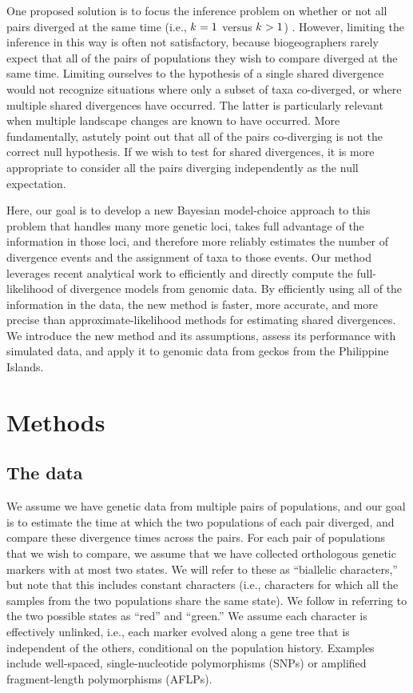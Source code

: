 One proposed solution is to focus the inference problem on whether or not all
pairs diverged at the same time (i.e., $k_{} = 1$ versus
$k_{} > 1$) \citep{Hickerson2013}.
However, limiting the inference in this way is often not satisfactory, because
biogeographers rarely expect that all of the pairs of populations they wish
to compare diverged at the same time.
Limiting ourselves to the hypothesis of a single shared divergence would not
recognize situations where only a subset of taxa co-diverged, or where multiple
shared divergences have occurred.
The latter is particularly relevant when multiple landscape changes are known
to have occurred.
More fundamentally,
\citet{Papadopoulou2016}
astutely point out that all of the pairs co-diverging is not the correct null
hypothesis.
If we wish to test for shared divergences, it is more appropriate to consider
all the pairs diverging independently as the null expectation.

Here, our goal is to develop a new Bayesian model-choice approach to this
problem that
handles many more genetic loci,
takes full advantage of the information in those loci,
and therefore more reliably
estimates the number of divergence events and the assignment of taxa to those
events.
Our method leverages recent analytical work \citep{Bryant2012} to efficiently
and directly compute the full-likelihood of divergence models from genomic
data.
By efficiently using all of the information in the data, the new method is
faster,
more accurate,
and more precise
than approximate-likelihood methods for
estimating shared divergences.
We introduce the new method and its assumptions, assess its performance with
simulated data, and apply it to genomic data from geckos from the Philippine
Islands.


\section{Methods}

\subsection{The data}
We assume we have genetic data from multiple pairs of populations, and our goal
is to estimate the time at which the two populations of each pair diverged, and
compare these divergence times across the pairs.
For each pair of populations that we wish to compare, we assume that we have
collected orthologous genetic markers with at most two states.
We will refer to these as ``biallelic characters,'' but note that this includes
constant characters (i.e., characters for which all the samples
from the two populations share the same state).
We follow \citet{Bryant2012} in referring to the two possible
states as ``red'' and ``green.''
We assume each character is effectively unlinked, i.e., each marker evolved
along a gene tree that is independent of the others, conditional on the
population history.
Examples include well-spaced, single-nucleotide polymorphisms (SNPs) or
amplified fragment-length polymorphisms (AFLPs).


